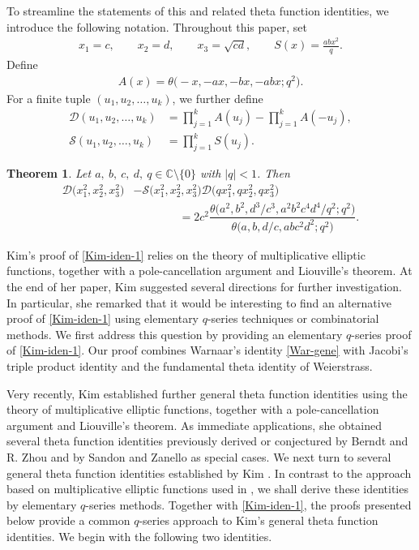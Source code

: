 \documentclass[12pt,reqno]{amsart}
\numberwithin{equation}{section}
\theoremstyle{plain}
\newtheorem{theorem}{Theorem}[section]
\theoremstyle{definition}
\begin{document}
To streamline the statements of this and related theta function identities, we
introduce the following notation. Throughout this paper, set
\begin{align*}
x_1=c,\qquad x_2=d,\qquad x_3=\sqrt{cd},\qquad S(x)=\frac{abx^2}{q}.
\end{align*}
Define
\begin{align*}
A(x)=\theta\big({-}x,-ax,-bx,-abx;q^2\big).
\end{align*}
For a finite tuple $(u_1,u_2,\ldots,u_k)$, we further define
\begin{align*}
\mathscr{D}(u_1,u_2,\ldots,u_k) &=\prod_{j=1}^k A(u_j)-\prod_{j=1}^k A(-u_j),\\
\mathscr{S}(u_1,u_2,\ldots,u_k) &=\prod_{j=1}^k S(u_j).
\end{align*}


\begin{theorem}{\textup{\cite[Theorem~1.3]{Kim2021}}}\label{Main-THM-1}
Let $a,\!\:b,\!\:c,\!\:d,\!\:q\in\mathbb{C}\setminus\{0\}$ with $|q|<1$. Then
\begin{align}
\mathscr{D}\big(x_1^2,x_2^2,x_3^2\big) &-\mathscr{S}\big(x_1^2,x_2^2,x_3^2\big)
\mathscr{D}\big(qx_1^2,qx_2^2,qx_3^2\big)\nonumber\\
 &\qquad\qquad=2c^2\dfrac{\theta\big(a^2,b^2,d^3/c^3,a^2b^2c^4d^4/q^2;q^2\big)}
{\theta\big(a,b,d/c,abc^2d^2;q^2\big)}.\label{Kim-iden-1}
\end{align}
\end{theorem}

Kim's proof of \eqref{Kim-iden-1} relies on the theory of multiplicative elliptic
functions, together with a pole-cancellation argument and Liouville's theorem. At the
end of her paper, Kim suggested several directions for further investigation. In
particular, she \cite[p.~13]{Kim2021} remarked that it would be interesting to find
an alternative proof of \eqref{Kim-iden-1} using elementary $q$-series techniques or
combinatorial methods. We first address this question by providing an elementary
$q$-series proof of \eqref{Kim-iden-1}. Our proof combines Warnaar's identity
\eqref{War-gene} with Jacobi's triple product identity and the fundamental theta
identity of Weierstrass.

Very recently, Kim \cite{Kim2026} established further general theta function
identities using the theory of multiplicative elliptic functions, together with a
pole-cancellation argument and Liouville's theorem. As immediate applications, she
obtained several theta function identities previously derived or conjectured by Berndt
and R. Zhou \cite{BZ2015} and by Sandon and Zanello \cite{SZ2014} as special cases.
We next turn to several general theta function identities established by Kim \cite{Kim2026}. In contrast to the approach based on multiplicative elliptic functions
used in \cite{Kim2026}, we shall derive these identities by elementary $q$-series
methods. Together with \eqref{Kim-iden-1}, the proofs presented below provide a common
$q$-series approach to Kim's general theta function identities. We begin with the following two identities.
\end{document}
